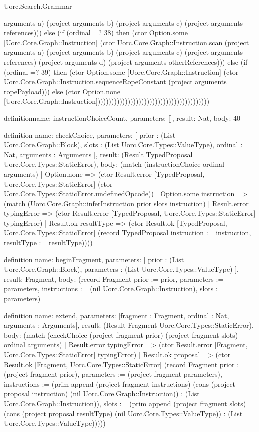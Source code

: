 \begin{lexlean}{Uorc.Search.Grammar}
\begin{semanticmodule}
{arguments a) (project arguments b) (project arguments c) (project arguments references))) else (if (ordinal =? 38) then (ctor Option.some [Uorc.Core.Graph::Instruction] (ctor Uorc.Core.Graph::Instruction.scan (project arguments a) (project arguments b) (project arguments c) (project arguments references) (project arguments d) (project arguments otherReferences))) else (if (ordinal =? 39) then (ctor Option.some [Uorc.Core.Graph::Instruction] (ctor Uorc.Core.Graph::Instruction.sequenceRopeConstant (project arguments ropePayload))) else (ctor Option.none [Uorc.Core.Graph::Instruction])))))))))))))))))))))))))))))))))))))))))
}

definition{name: instructionChoiceCount, parameters: [], result: Nat, body: 40}

definition{
  name: checkChoice,
  parameters: [
    prior : (List Uorc.Core.Graph::Block),
    slots : (List Uorc.Core.Types::ValueType),
    ordinal : Nat,
    arguments : Arguments
  ],
  result: (Result TypedProposal Uorc.Core.Types::StaticError),
  body: (match (instructionChoice ordinal arguments)
    | Option.none => (ctor Result.error [TypedProposal, Uorc.Core.Types::StaticError] (ctor Uorc.Core.Types::StaticError.undefinedOpcode))
    | Option.some instruction => (match (Uorc.Core.Graph::inferInstruction prior slots instruction)
      | Result.error typingError => (ctor Result.error [TypedProposal, Uorc.Core.Types::StaticError] typingError)
      | Result.ok resultType => (ctor Result.ok [TypedProposal, Uorc.Core.Types::StaticError] (record TypedProposal {instruction := instruction, resultType := resultType}))))
}

definition{
  name: beginFragment,
  parameters: [
    prior : (List Uorc.Core.Graph::Block),
    parameters : (List Uorc.Core.Types::ValueType)
  ],
  result: Fragment,
  body: (record Fragment {prior := prior, parameters := parameters, instructions := (nil Uorc.Core.Graph::Instruction), slots := parameters})
}

definition{
  name: extend,
  parameters: [fragment : Fragment, ordinal : Nat, arguments : Arguments],
  result: (Result Fragment Uorc.Core.Types::StaticError),
  body: (match (checkChoice (project fragment prior) (project fragment slots) ordinal arguments)
    | Result.error typingError => (ctor Result.error [Fragment, Uorc.Core.Types::StaticError] typingError)
    | Result.ok proposal => (ctor Result.ok [Fragment, Uorc.Core.Types::StaticError] (record Fragment {prior := (project fragment prior), parameters := (project fragment parameters), instructions := (prim append (project fragment instructions) (cons (project proposal instruction) (nil Uorc.Core.Graph::Instruction)) : (List Uorc.Core.Graph::Instruction)), slots := (prim append (project fragment slots) (cons (project proposal resultType) (nil Uorc.Core.Types::ValueType)) : (List Uorc.Core.Types::ValueType))})))
}


\end{semanticmodule}
\end{lexlean}
